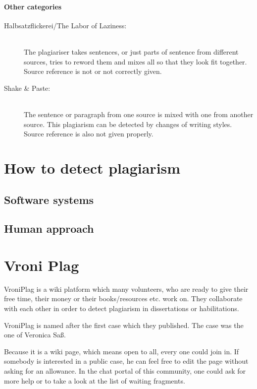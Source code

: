 \paragraph{Other categories}


\begin{description}
\item[Halbsatzflickerei/The Labor of Laziness:] \hfill \\
The plagiariser takes sentences, or just parts of sentence from different 
sources, tries to reword them and mixes all so that they look fit together. Source reference is not or not correctly 
given.

\item[Shake \& Paste:] \hfill \\
The sentence or paragraph from one source is mixed with one from another source. This 
plagiarism can be detected by changes of writing styles. Source reference is also not given properly.
\end{description}

\section{How to detect plagiarism}
\subsection{Software systems}
\subsection{Human approach}

\section{Vroni Plag}

VroniPlag is a wiki platform which many volunteers, who are ready to give their free time, their money or 
their books/resources etc. work on. They collaborate with each other in order to detect plagiarism in dissertations or
habilitations.

VroniPlag is named after the first case which they published. The case was the one of Veronica Saß.

Because it is a wiki page, which means open to all, every one could join in. If somebody is interested in a public 
case, he can feel free to edit the page without asking for an allowance. In the chat portal of this community, one could 
ask for more help or to take a look at the list of waiting fragments.

